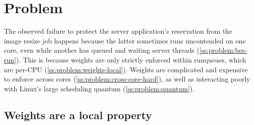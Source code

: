 \section{Problem}\label{s:problem}

The observed failure to protect the server application's reservation from the
image resize job happens because the latter sometimes runs uncontended on one
core, even while another has queued and waiting server threads
(\autoref{ss:problem:bes-run}). This is because weights are only strictly
enforced within runqueues, which are per-CPU
(\autoref{ss:problem:weights-local}). Weights are complicated and expensive to
enforce across cores (\autoref{ss:problem:cross-core-hard}), as well as
interacting poorly with Linux's large scheduling quantum
(\autoref{ss:problem:quantum}).

\subsection{Weights are a local property}\label{ss:problem:bes-run}

